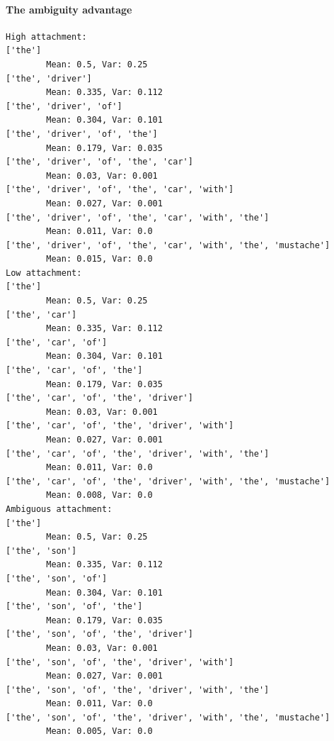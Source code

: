 \documentclass[a4paper, 12pt]{article}
\begin{document}
\paragraph{The ambiguity advantage}

\begin{verbatim}
High attachment:
['the']
        Mean: 0.5, Var: 0.25
['the', 'driver']
        Mean: 0.335, Var: 0.112
['the', 'driver', 'of']
        Mean: 0.304, Var: 0.101
['the', 'driver', 'of', 'the']
        Mean: 0.179, Var: 0.035
['the', 'driver', 'of', 'the', 'car']
        Mean: 0.03, Var: 0.001
['the', 'driver', 'of', 'the', 'car', 'with']
        Mean: 0.027, Var: 0.001
['the', 'driver', 'of', 'the', 'car', 'with', 'the']
        Mean: 0.011, Var: 0.0
['the', 'driver', 'of', 'the', 'car', 'with', 'the', 'mustache']
        Mean: 0.015, Var: 0.0
Low attachment:
['the']
        Mean: 0.5, Var: 0.25
['the', 'car']
        Mean: 0.335, Var: 0.112
['the', 'car', 'of']
        Mean: 0.304, Var: 0.101
['the', 'car', 'of', 'the']
        Mean: 0.179, Var: 0.035
['the', 'car', 'of', 'the', 'driver']
        Mean: 0.03, Var: 0.001
['the', 'car', 'of', 'the', 'driver', 'with']
        Mean: 0.027, Var: 0.001
['the', 'car', 'of', 'the', 'driver', 'with', 'the']
        Mean: 0.011, Var: 0.0
['the', 'car', 'of', 'the', 'driver', 'with', 'the', 'mustache']
        Mean: 0.008, Var: 0.0
Ambiguous attachment:
['the']
        Mean: 0.5, Var: 0.25
['the', 'son']
        Mean: 0.335, Var: 0.112
['the', 'son', 'of']
        Mean: 0.304, Var: 0.101
['the', 'son', 'of', 'the']
        Mean: 0.179, Var: 0.035
['the', 'son', 'of', 'the', 'driver']
        Mean: 0.03, Var: 0.001
['the', 'son', 'of', 'the', 'driver', 'with']
        Mean: 0.027, Var: 0.001
['the', 'son', 'of', 'the', 'driver', 'with', 'the']
        Mean: 0.011, Var: 0.0
['the', 'son', 'of', 'the', 'driver', 'with', 'the', 'mustache']
        Mean: 0.005, Var: 0.0
\end{verbatim}


\end{document}
